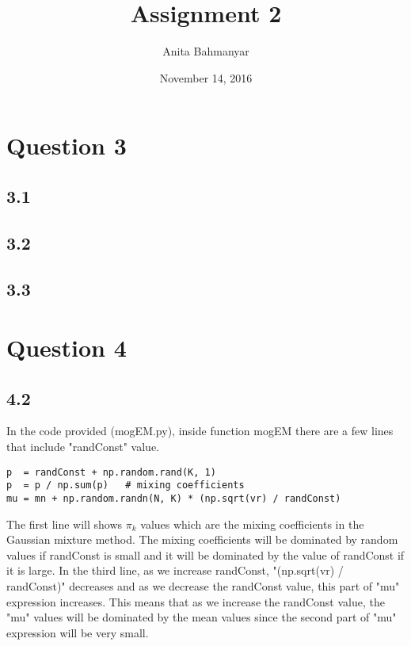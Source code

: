 \documentclass[10pt]{article}
\title{Assignment 2}
\author{Anita Bahmanyar}
\date{November 14, 2016}
\begin{document}
\maketitle


\section*{Question 3}
\subsection*{3.1}

\subsection*{3.2}

\subsection*{3.3}

\section*{Question 4}
\subsection*{4.2}
In the code provided (mogEM.py), inside function mogEM there are a few lines that include "randConst" value.
\begin{verbatim}
p  = randConst + np.random.rand(K, 1)
p  = p / np.sum(p)   # mixing coefficients
mu = mn + np.random.randn(N, K) * (np.sqrt(vr) / randConst)
\end{verbatim}
The first line will shows $\pi_k$ values which are the mixing coefficients in the Gaussian mixture method. The mixing coefficients will be dominated by random values if randConst is small and it will be dominated by the value of randConst if it is large.
In the third line, as we increase randConst, "(np.sqrt(vr) / randConst)" decreases and as we decrease the randConst value, this part of "mu" expression increases. This means that as we increase the randConst value, the "mu" values will be dominated by the mean values since the second part of "mu" expression will be very small.
\end{document}
